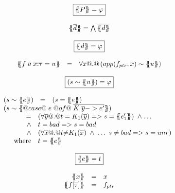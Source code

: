 \documentclass[preprint]{sigplanconf}
\begin{document}
\begin{figure}
\setlength{\arraycolsep}{2pt}
\[\begin{array}{c}
\ruleform{\ptrans{\Sigma}{P} = \formula{\phi} } \\ \\ 
\ptrans{\Sigma}{\ol{d}} = \bigwedge \ol{\dtrans{\Sigma}{d}}
\\ \\
\ruleform{\dtrans{\Sigma}{d} = \formula{\phi}} \\ \\
\begin{array}{rcl}
  \dtrans{\Sigma}{f \;\ol{a}\;\ol{x{:}\tau} = u}
    & =     & \formula{\forall \ol{x} @.@\, \utrans{\sigma}{u}{app(f_{ptr},\xs)}} \\
\end{array}
\\ \\
\ruleform{\utrans{\Sigma}{u}{s} = \formula{\phi}} \\ \\
\begin{array}{rcl}
\utrans{\Sigma}{e}{s}
  & = & \formula{(s = \etrans{\Sigma}{\Gamma}{e})} \\
\multicolumn{3}{l}{\utrans{\Sigma}
    {@case@\;e\;@of@\;\ol{K\;\ol{y} -> e'}}{s}} \\
\multicolumn{3}{l}{
\quad
  \begin{array}[t]{rl}
    = & \formula{(\forall \ol{y} @.@ t = K_1(\ol{y}) => s = \etrans{\Sigma}{\Gamma}{e'_1})\;\land \ldots}  \\
    \land & t = \bad => s = \bad \\
    \land & \formula{(\forall \xs @.@ t{\neq}K_1(\xs)\;\land\;\ldots\; s \neq \bad => s=\unr)} \\
    \mbox{where} & t  =  \etrans{\Sigma}{\Gamma}{e}
 \end{array}
}
\end{array}
\\ \\
\ruleform{\etrans{\Sigma}{\Gamma}{e} = \formula{t} } \\ \\
\begin{array}{rcl}
\etrans{\Sigma}{\Gamma}{x} & = & \formula{x} \\
\etrans{\Sigma}{\Gamma}{f[\ol{\tau}]} & = & \formula{f_{ptr}} \\

\end{array}
\end{array}\]
\end{figure}
\end{document}
